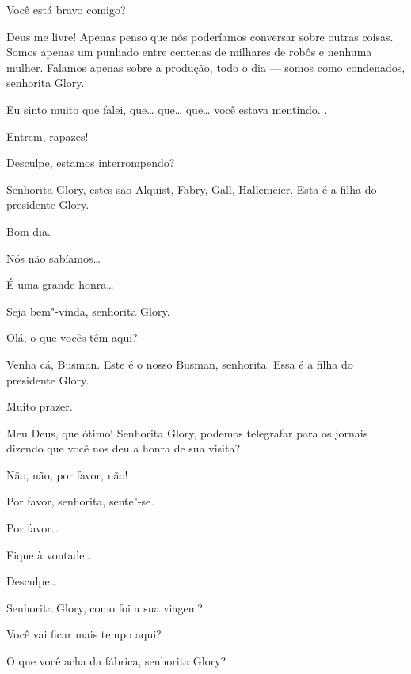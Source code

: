  Você está bravo comigo?

 Deus me livre! Apenas penso que nós poderíamos conversar sobre outras
coisas. Somos apenas um punhado entre centenas de milhares de robôs e nenhuma
mulher. Falamos apenas sobre a produção, todo o dia --- somos como 
condenados, senhorita Glory.

 Eu sinto muito que falei, que\ldots{} que\ldots{} que\ldots{} você estava mentindo.
.

 Entrem, rapazes!

 Desculpe, estamos interrompendo?

 Senhorita Glory, estes são Alquist, Fabry, Gall, Hallemeier.
Esta é a filha do presidente Glory.

  Bom dia.

 Nós não sabíamos\ldots{}

 É uma grande honra\ldots{}

 Seja bem"-vinda, senhorita Glory.

 Olá, o que vocês têm aqui?

 Venha cá, Busman. Este é o nosso Busman, senhorita. Essa é a filha do
presidente Glory.

 Muito prazer.

 Meu Deus, que ótimo! Senhorita Glory, podemos telegrafar para os jornais
dizendo que você nos deu a honra de sua visita?

 Não, não, por favor, não!

 Por favor, senhorita, sente"-se.

 Por favor\ldots{}

 Fique à vontade\ldots{}

 Desculpe\ldots{}

 Senhorita Glory, como foi a sua viagem?

 Você vai ficar mais tempo aqui?

 O que você acha da fábrica, senhorita Glory?

